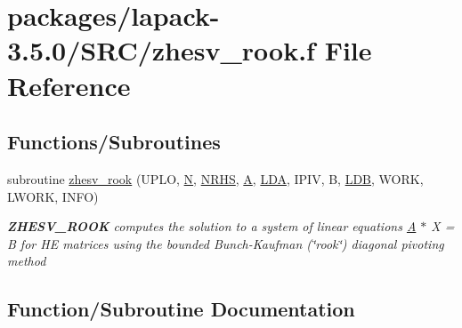\hypertarget{zhesv__rook_8f}{}\section{packages/lapack-\/3.5.0/\+S\+R\+C/zhesv\+\_\+rook.f File Reference}
\label{zhesv__rook_8f}
\subsection*{Functions/\+Subroutines}
\begin{DoxyCompactItemize}
\item 
subroutine \hyperlink{zhesv__rook_8f_a566409efe6c6b00a221afd360c73c5ba}{zhesv\+\_\+rook} (U\+P\+L\+O, \hyperlink{polmisc_8c_a0240ac851181b84ac374872dc5434ee4}{N}, \hyperlink{example__user_8c_aa0138da002ce2a90360df2f521eb3198}{N\+R\+H\+S}, \hyperlink{classA}{A}, \hyperlink{example__user_8c_ae946da542ce0db94dced19b2ecefd1aa}{L\+D\+A}, I\+P\+I\+V, B, \hyperlink{example__user_8c_a50e90a7104df172b5a89a06c47fcca04}{L\+D\+B}, W\+O\+R\+K, L\+W\+O\+R\+K, I\+N\+F\+O)
\begin{DoxyCompactList}\small\item\em {\bfseries Z\+H\+E\+S\+V\+\_\+\+R\+O\+O\+K} computes the solution to a system of linear equations \hyperlink{classA}{A} $\ast$ X = B for H\+E matrices using the bounded Bunch-\/\+Kaufman (\char`\"{}rook\char`\"{}) diagonal pivoting method \end{DoxyCompactList}\end{DoxyCompactItemize}


\subsection{Function/\+Subroutine Documentation}
\hypertarget{zhesv__rook_8f_a566409efe6c6b00a221afd360c73c5ba}{}
